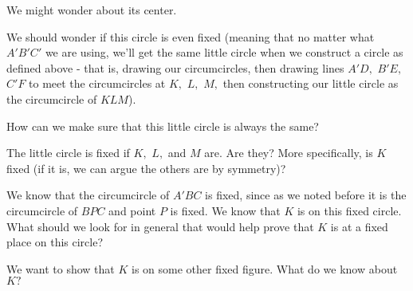 
We might wonder about its center.

We should wonder if this circle is even fixed (meaning that no matter what $A'B'C'$ we are using, we'll get the same little circle when we construct a circle as defined above - that is, drawing our circumcircles, then drawing lines $A'D,$ $B'E,$ $C'F$ to meet the circumcircles at $K,$ $L,$ $M,$ then constructing our little circle as the circumcircle of $KLM$).

How can we make sure that this little circle is always the same?


The little circle is fixed if $K,$ $L,$ and $M$ are. Are they? More specifically, is $K$ fixed (if it is, we can argue the others are by symmetry)?

We know that the circumcircle of $A'BC$ is fixed, since as we noted before it is the circumcircle of $BPC$ and point $P$ is fixed. We know that $K$ is on this fixed circle. What should we look for in general that would help prove that $K$ is at a fixed place on this circle?

We want to show that $K$ is on some other fixed figure. What do we know about $K?$








